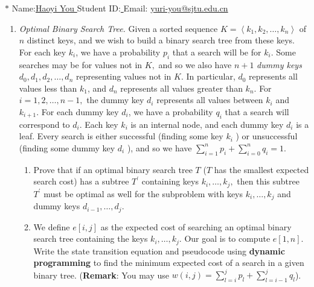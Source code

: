 \documentclass[12pt,a4paper]{article}
\theoremstyle{definition}
\begin{document}
	\noindent
	
	\noindent{}
\begin{center}
\footnotesize{\color{blue}$*$ Name:\underline{\quad   Haoyi You  \quad  }\quad Student ID:\underline{ \quad} \quad Email: \underline{\quad yuri-you@sjtu.edu.cn \quad}}
\end{center}
	
	\begin{enumerate}
		\item \textit{Optimal Binary Search Tree.} Given a sorted sequence $K=\left \langle k_{1}, k_{2}, \ldots, k_{n} \right \rangle$ of $n$ distinct keys, and we wish to build a binary search tree from these keys. For each key $k_{i}$, we have a probability $p_{i}$ that a search will be for $k_{i}$. Some searches may be for values not in $K,$ and so we also have $n+1$ \emph{dummy keys} $d_{0}, d_{1}, d_{2}, \ldots, d_{n}$ representing values not in $K$. In particular, $d_{0}$ represents all values less than $k_{1}$, and $d_{n}$ represents all values greater than $k_{n}$. For $i=1,2, \ldots, n-1,$ the dummy key $d_{i}$ represents all values between $k_{i}$ and $k_{i+1}$. For each dummy key $d_{i}$, we have a probability $q_{i}$ that a search will correspond to $d_{i}$. Each key $k_{i}$ is an internal node, and each dummy key $d_{i}$ is a leaf. Every search is either successful (finding some key $k_{i}$ ) or unsuccessful (finding some dummy key $d_{i}$ ), and so we have $ \sum_{i=1}^{n} p_{i}+\sum_{i=0}^{n} q_{i}=1 $. 
		\begin{enumerate}
			\item Prove that if an optimal binary search tree $T$ ($ T $ has the smallest expected search cost) has a subtree $T^{\prime}$ containing keys $k_{i}, \ldots, k_{j},$ then this subtree $T^{\prime}$ must be optimal as well for the subproblem with keys $k_{i}, \ldots, k_{j}$ and dummy keys $d_{i-1}, \ldots, d_{j}$. 
			\item We define $e[i, j]$ as the expected cost of searching an optimal binary search tree containing the keys $k_{i}, \ldots, k_{j} .$ Our goal is to compute $e[1, n]$. Write the state transition equation and pseudocode using \textbf{dynamic programming} to find
			the minimum expected cost of a search in a given binary tree. (\textbf{Remark}: You may use $ w(i, j)=\sum_{l=i}^{j} p_{l}+\sum_{l=i-1}^{j} q_{l} $).

\end{enumerate}
\end{enumerate}
\end{document}
